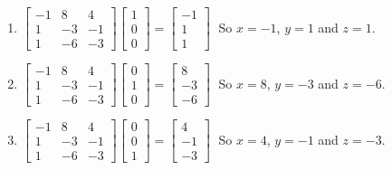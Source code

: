 \begin{enumerate}
\setcounter{enumi}{\value{HW}}

\item $\left[ \begin{array}{rrr} -1 & 8 & 4 \\ 1 & -3 & -1 \\ 1 & -6 & -3 \end{array} \right] \left[ \begin{array}{r} 1 \\ 0 \\ 0 \end{array} \right] = \left[ \begin{array}{r} -1 \\ 1 \\ 1 \end{array} \right] \;$ So $x = -1$, $y = 1$ and $z = 1$.
\item $\left[ \begin{array}{rrr} -1 & 8 & 4 \\ 1 & -3 & -1 \\ 1 & -6 & -3 \end{array} \right] \left[ \begin{array}{r} 0 \\ 1 \\ 0 \end{array} \right] = \left[ \begin{array}{r} 8 \\ -3 \\ -6 \end{array} \right] \;$ So $x = 8$, $y = -3$ and $z = -6$.
\item $\left[ \begin{array}{rrr} -1 & 8 & 4 \\ 1 & -3 & -1 \\ 1 & -6 & -3 \end{array} \right] \left[ \begin{array}{r} 0 \\ 0 \\ 1 \end{array} \right] = \left[ \begin{array}{r} 4 \\ -1 \\ -3 \end{array} \right] \;$ So $x = 4$, $y = -1$ and $z = -3$.

\setcounter{HW}{\value{enumi}}
\end{enumerate}

